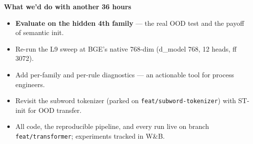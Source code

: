 \documentclass[12pt]{article}
\newcommand{\slide}[2]{%
  \begingroup
  {\color{navy}\Huge\bfseries #1\par}%
  \vspace{2pt}{\color{accent}\rule{\linewidth}{2pt}}\par
  \vspace{14pt}\Large #2
  \endgroup
  \clearpage}
\begin{document}
\slide{What we'd do with another 36 hours}{
\begin{itemize}
  \item \textbf{Evaluate on the hidden 4th family} --- the real OOD test and the payoff of semantic init.
  \item Re-run the L9 sweep at BGE's native 768-dim (d\_model 768, 12 heads, ff 3072).
  \item Add per-family and per-rule diagnostics --- an actionable tool for process engineers.
  \item Revisit the subword tokenizer (parked on \texttt{feat/subword-tokenizer}) with ST-init for OOD transfer.
  \item All code, the reproducible pipeline, and every run live on branch \texttt{feat/transformer}; experiments tracked in W\&B.
\end{itemize}}
\end{document}
